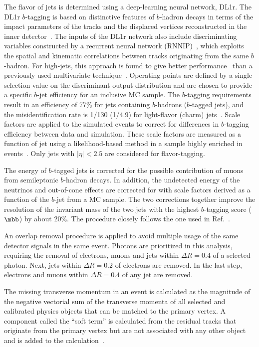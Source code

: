 \documentclass[PAPER, cernpreprint, texlive=2016, paper=a4, USenglish, texmf]{atlasdoc}
\begin{document}
The flavor of jets is determined using a deep-learning neural network, DL1r.
The DL1r $b$-tagging is based on distinctive features of $b$-hadron decays in terms of the impact parameters
of the tracks and the displaced vertices reconstructed in the inner detector~\cite{FTAG-2018-01}.
The inputs of the DL1r network also include discriminating variables constructed by a recurrent neural network (RNNIP)~\cite{ATL-PHYS-PUB-2017-003}, which
exploits the spatial and kinematic correlations between tracks originating from the same $b$-hadron. For high-\pt jets, this
approach is found to give better performance~\cite{ATL-PHYS-PUB-2017-013} than a previously used multivariate technique~\cite{PERF-2012-04}. Operating points are
defined by a single selection value on the discriminant output distribution and are chosen to provide a specific
$b$-jet efficiency for an inclusive \ttbar{} MC sample.
The $b$-tagging requirements result in an efficiency of 77\% for jets containing $b$-hadrons ($b$-tagged jets), and the misidentification rate is 1/130 (1/4.9) for light-flavor (charm) jets~\cite{FTAG-2018-01}.
Scale factors are applied to the simulated events to correct for differences in $b$-tagging efficiency between data and simulation. These scale factors are measured as a function of jet \pt{} using a likelihood-based method in a sample highly enriched in \ttbar{} events~\cite{FTAG-2018-01}. Only jets with $|\eta|<2.5$ are considered for flavor-tagging.
 
The energy of $b$-tagged jets is corrected for the possible contribution of muons from semileptonic $b$-hadron decays. In addition, the undetected energy of the neutrinos and out-of-cone effects are corrected for with scale factors derived as a function of the $b$-jet \pt{} from a \ttbar{} MC sample. The two corrections together improve the resolution of the invariant mass of the two jets with the highest $b$-tagging score ($\mbb$) by about 20\%. The procedure closely follows the one used in Ref.~\cite{HIGG-2016-29}.
 
An overlap removal procedure is applied to avoid multiple usage of the same detector signals in the same event.
Photons are prioritized in this analysis, requiring the removal of electrons, muons and jets within $\Delta R = 0.4$ of a selected photon.
Next, jets within $\Delta R = 0.2$ of electrons are removed.
In the last step, electrons and muons within $\Delta R = 0.4$ of any jet are removed.
 
The missing transverse momentum \etmiss{} in an event is calculated as the magnitude of the negative vectorial sum of the transverse momenta of all selected and calibrated physics objects that can be matched to the primary vertex. A component called the ``soft term'' is calculated from the residual tracks that originate from the primary vertex but are not associated with any other object and is added to the \etmiss calculation~\cite{PERF-2016-07}.
 
\end{document}
